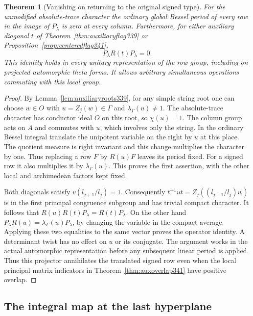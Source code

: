 \documentclass[a4paper,11pt]{article}
\newtheorem{theorem}[proposition]{Theorem}
\theoremstyle{definition}
\theoremstyle{remark}
\numberwithin{equation}{section}
\begin{document}
\begin{theorem}[Vanishing on returning to the original signed type]\leavevmode\label{thm:signedreturn342}
For the unmodified absolute-trace character the ordinary global
Bessel period of every row in the image of $P_\lambda$ is zero at
every column. Furthermore, for either auxiliary diagonal $t$ of
Theorem~\ref{thm:auxiliaryflag339} or Proposition~\ref{prop:centeredflag341},
\[
                        P_\lambda R(t)P_\lambda=0 .
\]
This identity holds in every unitary representation of the row
group, including on projected automorphic theta forms. It allows
arbitrary simultaneous operations commuting with this local group.
\end{theorem}
\begin{proof}
By Lemma~\ref{lem:auxiliaryroots339}, for any simple string root
one can choose $w\in O$ with $u=Z_j(w)\in\Gamma$ and
$\lambda_\Gamma(u)\ne1$. The absolute-trace character has conductor
ideal $O$ on this root, so $\chi(u)=1$. The column group acts on
$A$ and commutes with $u$, which involves only the string. In the
ordinary Bessel integral translate the unipotent variable on the
right by $u$ at this place. The quotient measure is right invariant
and this change multiplies the character by one. Thus replacing a
row $F$ by $R(u)F$ leaves its period fixed. For a signed row it
also multiplies it by $\lambda_\Gamma(u)$. This proves the first
assertion, with the other local and archimedean factors kept fixed.

Both diagonals satisfy $v(l_{j+1}/l_j)=1$. Consequently
$t^{-1}ut=Z_j((l_{j+1}/l_j)w)$ is in the first principal congruence
subgroup and has trivial compact character. It follows that
$R(u)R(t)P_\lambda=R(t)P_\lambda$. On the other hand
$P_\lambda R(u)=\lambda_\Gamma(u)P_\lambda$, by changing the variable
in the compact average. Applying these two equalities to the same
vector proves the operator identity. A determinant twist has no
effect on $u$ or its conjugate. The argument works in the actual
automorphic representation before any subsequent linear period is
applied. Thus this projector annihilates the translated signed row
even when the local principal matrix indicators in
Theorem~\ref{thm:auxoverlap341} have positive overlap.
\end{proof}


\subsection{The integral map at the last hyperplane}\label{sec:lowerlattice347}
\end{document}
